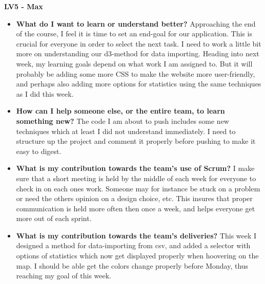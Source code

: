\documentclass[]{article}
\begin{document}
\textbf{\large{LV5 - Max}}

\begin{itemize}
    \item \textbf{What do I want to learn or understand better?} \newline
    Approaching the end of the course, I feel it is time to set an end-goal for our application. This is crucial for everyone in order to select the next task. I need to work a little bit more on understanding our d3-method for data importing. Heading into next week, my learning goals depend on what work I am assigned to. But it will probably be adding some more CSS to make the website more user-friendly, and perhaps also adding more options for statistics using the same techniques as I did this week.
    
    \item \textbf{How can I help someone else, or the entire team, to learn something new?} \newline
    The code I am about to push includes some new techniques which at least I did not understand immediately. I need to structure up the project and comment it properly before pushing to make it easy to digest.
    
    \item \textbf{What is my contribution towards the team’s use of Scrum?} \newline
    I make sure that a short meeting is held by the middle of each week for everyone to check in on each ones work. Someone may for instance be stuck on a problem or need the others opinion on a design choice, etc. This insures that proper communication is held more often then once a week, and helps everyone get more out of each sprint.  
    
    \item \textbf{What is my contribution towards the team’s deliveries?} \newline
    This week I designed a method for data-importing from csv, and added a selector with options of statistics which now get displayed properly when hoovering on the map. I should be able get the colors change properly before Monday, thus reaching my goal of this week. 
 
    

 
 
\end{itemize}
\end{document}
